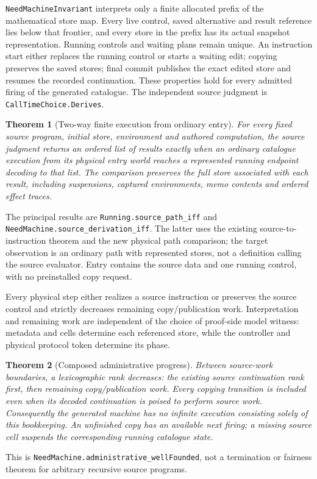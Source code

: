 \documentclass[11pt]{article}
\newtheorem{theorem}{Theorem}
\newcommand{\code}[1]{\texttt{\small #1}}
\begin{document}
\code{NeedMachineInvariant} interprets only a finite allocated prefix of
the mathematical store map. Every live control, saved alternative and
result reference lies below that frontier, and every store in the prefix
has its actual snapshot representation. Running controls and waiting plans
remain unique. An instruction start either replaces the running control
or starts a waiting edit; copying preserves the saved stores; final commit
publishes the exact edited store and resumes the recorded continuation.
These properties hold for every admitted firing of the generated catalogue.
The independent source judgment is \code{CallTimeChoice.Derives}.

\begin{theorem}[Two-way finite execution from ordinary entry]
For every fixed source program, initial store, environment and authored
computation, the source judgment returns an ordered list of results exactly when an ordinary
catalogue execution from its physical entry world reaches a represented
running endpoint decoding to that list. The comparison preserves the full
store associated with each result, including suspensions, captured
environments, memo contents and ordered effect traces.
\end{theorem}
The principal results are \code{Running.source\_path\_iff} and
\code{NeedMachine.source\_derivation\_iff}. The latter uses the existing
source-to-instruction theorem and the new physical path comparison; the
target observation is an ordinary path with represented stores, not a
definition calling the source evaluator. Entry contains the source data
and one running control, with no preinstalled copy request.

Every physical step either realizes a source instruction or preserves the
source control and strictly decreases remaining copy/publication work.
Interpretation and remaining work are independent of the choice of
proof-side model witness: metadata and cells determine each referenced
store, while the controller and physical protocol token determine its
phase.

\begin{theorem}[Composed administrative progress]
Between source-work boundaries, a lexicographic rank decreases: the
existing source continuation rank first, then remaining copy/publication
work. Every copying transition is included even when its decoded
continuation is poised to perform source work. Consequently the generated
machine has no infinite execution consisting solely of this bookkeeping.
An unfinished copy has an available next firing; a missing source cell
suspends the corresponding running catalogue state.
\end{theorem}
This is \code{NeedMachine.administrative\_wellFounded}, not a termination
or fairness theorem for arbitrary recursive source programs.
\end{document}
